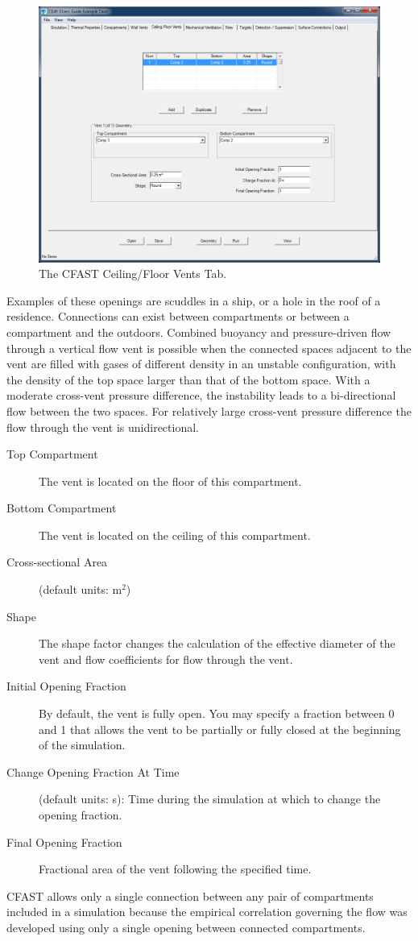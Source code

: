 \begin{figure}[h!]
\includegraphics[width=6.5in]{FIGURES/Vertical_Flow_Tab}
\caption[The CFAST Ceiling/Floor Vents Tab]{The CFAST Ceiling/Floor Vents Tab.}
\end{figure}

Examples of these openings are scuddles in a ship, or a hole in the roof of a residence. Connections can exist between compartments or between a compartment and the outdoors. Combined buoyancy and pressure-driven flow through a vertical flow vent is possible when the connected spaces adjacent to the vent are filled with gases of different density in an unstable configuration, with the density of the top space larger than that of the bottom space. With a moderate cross-vent pressure difference, the instability leads to a bi-directional flow between the two spaces. For relatively large cross-vent pressure difference the flow through the vent is unidirectional.
\begin{description}
\item[Top Compartment] The vent is located on the floor of this compartment.
\item[Bottom Compartment] The vent is located on the ceiling of this compartment.
\item[Cross-sectional Area] (default units: m$^2$)
\item[Shape] The shape factor changes the calculation of the effective diameter of the vent and flow coefficients for flow through the vent.
\item[Initial Opening Fraction] By default, the vent is fully open. You may specify a fraction between 0 and 1 that allows the vent to be partially or fully closed at the beginning of the simulation.
\item[Change Opening Fraction At Time] (default units: s): Time during the simulation at which to change the opening fraction.
\item[Final Opening Fraction] Fractional area of the vent following the specified time.
\end{description}
CFAST allows only a single connection between any pair of compartments included in a simulation because the empirical correlation governing the flow was developed using only a single opening between connected compartments.

